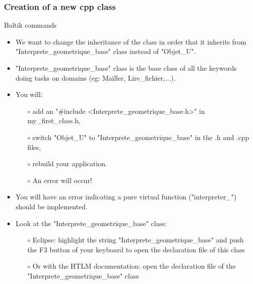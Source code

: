 \documentclass[10pt, hyperref={unicode=true,pdfusetitle, bookmarks=true,bookmarksnumbered=false,bookmarksopen=false, breaklinks=false,pdfborder={0 0 1},backref=true,colorlinks=true,linkcolor=darkblue,pageanchor, urlcolor=darkblue}]{beamer}
\begin{document}
\begin{frame}
\frametitle{Creation of a new cpp class}
\begin{block}{Baltik commands}

\begin{itemize}
\item We want to change the inheritance of the class in order that it inherits from "Interprete\_geometrique\_base" class
instead of "Objet\_U".

\item "Interprete\_geometrique\_base" class is the base class of all the keywords doing tasks on domains (eg: Mailler, Lire\_fichier,...).
\item You will:
    \begin{itemize}
    \item [$\circ$] add an "\#include <Interprete\_geometrique\_base.h>" in my\_first\_class.h,
    \item [$\circ$] switch "Objet\_U" to "Interprete\_geometrique\_base" in the .h and .cpp files,
    \item [$\circ$] rebuild your application.\\
    \item [$\circ$] An error will occur!
    \end{itemize}

\item You will have an error indicating a pure virtual function ("interpreter\_") should be implemented.

\item Look at the "Interprete\_geometrique\_base" class:
    \begin{itemize}
    \item [$\circ$] Eclipse: highlight the string "Interprete\_geometrique\_base" and push the F3 button of your keyboard to open the declaration file of this class
    \item [$\circ$] Or with the HTLM documentation: open the declaration file of the "Interprete\_geometrique\_base" class
    \end{itemize}
\end{itemize}

\end{block}
\end{frame}
\end{document}
